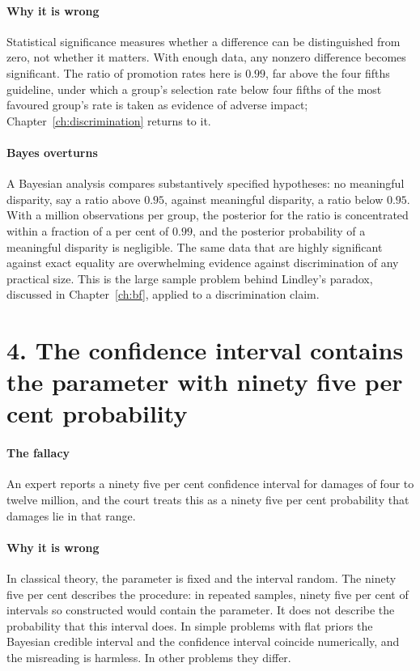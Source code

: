 \paragraph{Why it is wrong} Statistical significance measures whether a difference can be distinguished from zero, not whether it matters. With enough data, any nonzero difference becomes significant. The ratio of promotion rates here is $0.99$, far above the four fifths guideline, under which a group's selection rate below four fifths of the most favoured group's rate is taken as evidence of adverse impact; Chapter~\ref{ch:discrimination} returns to it.

\paragraph{Bayes overturns} A Bayesian analysis compares substantively specified hypotheses: no meaningful disparity, say a ratio above $0.95$, against meaningful disparity, a ratio below $0.95$. With a million observations per group, the posterior for the ratio is concentrated within a fraction of a per cent of $0.99$, and the posterior probability of a meaningful disparity is negligible. The same data that are highly significant against exact equality are overwhelming evidence against discrimination of any practical size. This is the large sample problem behind Lindley's paradox, discussed in Chapter~\ref{ch:bf}, applied to a discrimination claim.

\section{4. The confidence interval contains the parameter with ninety five per cent probability}

\paragraph{The fallacy} An expert reports a ninety five per cent confidence interval for damages of four to twelve million, and the court treats this as a ninety five per cent probability that damages lie in that range.

\paragraph{Why it is wrong} In classical theory, the parameter is fixed and the interval random. The ninety five per cent describes the procedure: in repeated samples, ninety five per cent of intervals so constructed would contain the parameter. It does not describe the probability that this interval does. In simple problems with flat priors the Bayesian credible interval and the confidence interval coincide numerically, and the misreading is harmless. In other problems they differ.

